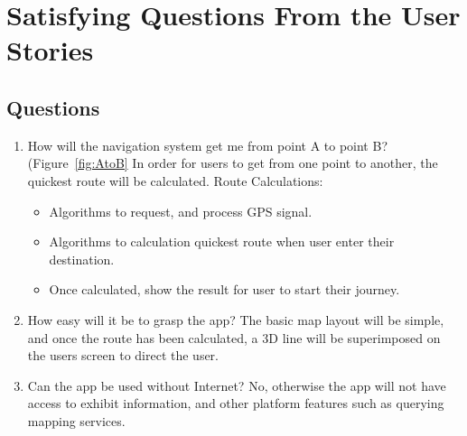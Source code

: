 \section{Satisfying Questions From the User Stories}
\subsection*{Questions}
\begin{enumerate}
    \item How will the navigation system get me from point A to point B? (Figure~\ref{fig:AtoB}
    In order for users to get from one point to another, the quickest route will be calculated.
    Route Calculations:
    \begin{itemize}
        \item Algorithms to request, and process GPS signal.
        \item Algorithms to calculation quickest route when user enter their destination.
        \item Once calculated, show the result for user to start their journey.
    \end{itemize}
    
    \item How easy will it be to grasp the app?
    The basic map layout will be simple, and once the route has been calculated, a 3D line will be superimposed on the users screen to direct the user.
    
    \item Can the app be used without Internet? 
    No, otherwise the app will not have access to exhibit information, and other platform features such as querying mapping services.

\end{enumerate}